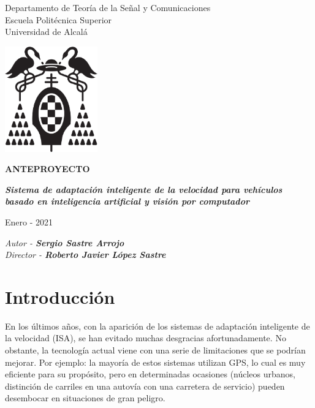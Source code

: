 \documentclass[12pt,oneside,a4paper]{article}
\begin{document}
\thispagestyle{empty}

\begin{center}


Departamento de Teoría de la Señal y Comunicaciones\\
Escuela Politécnica Superior\\
Universidad de Alcalá\\

\vspace{1cm}

\includegraphics[width=4cm]{figuras/logo-uah.eps}

\textbf{ANTEPROYECTO}

\vspace{1cm}

\begin{large}\textbf{\textit{Sistema de adaptación inteligente de la velocidad para vehículos basado en inteligencia artificial y visión por computador}}\end{large}

\vfill

Enero - 2021

\end{center}

\begin{flushright}
\textit{Autor - \textbf{Sergio Sastre Arrojo}} \\
\textit{Director - \textbf{Roberto Javier López Sastre}}
\end{flushright}

\newpage
\section{Introducción}

En los últimos años, con la aparición de los sistemas de adaptación inteligente de la velocidad (ISA), se han evitado muchas desgracias afortunadamente. No obstante, la tecnología actual viene con una serie de limitaciones que se podrían mejorar. Por ejemplo: la mayoría de estos sistemas utilizan GPS, lo cual es muy eficiente para su propósito, pero en determinadas ocasiones (núcleos urbanos, distinción de carriles en una autovía con una carretera de servicio) pueden desembocar en situaciones de gran peligro.
\end{document}
